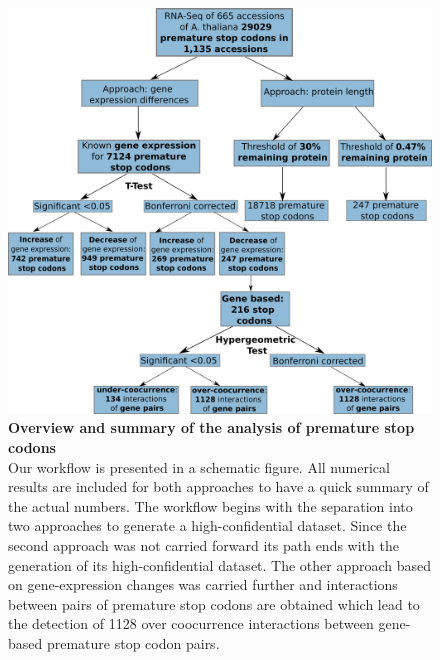 \begin{figure}[h!]
  \centering
  \begin{minipage}[h]{0.9\textwidth}
    \centering
    \includegraphics[width=1.0\textwidth]{images/Numbers_Workflow.png}
    \caption[Overview and summary of the analysis of premature stop codons]{\textbf{Overview and summary of the analysis of premature stop codons}\\
    Our workflow is presented in a schematic figure. All numerical results are included for both approaches to have a quick summary of the actual numbers. The workflow begins with the separation into two approaches to generate a high-confidential dataset. Since the second approach was not carried forward its path ends with the generation of its high-confidential dataset. The other approach based on gene-expression changes was carried further and interactions between pairs of premature stop codons are obtained which lead to the detection of 1128 over coocurrence interactions between gene-based premature stop codon pairs. 
    }
   \label{fig:Numbers_Workflow}
  \end{minipage}
\end{figure} 

